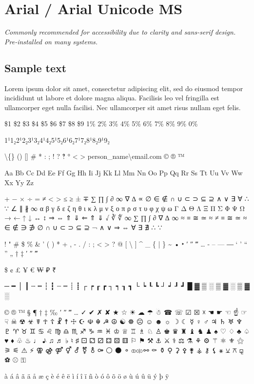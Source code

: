 \section{Arial / Arial Unicode MS}
\emph{Commonly recommended for accessibility due to clarity and sans-serif design. Pre-installed on many systems.}
\begin{raggedright}
\section*{Sample text}
Lorem ipsum dolor sit amet, consectetur adipiscing elit, sed do eiusmod tempor incididunt ut labore et dolore magna aliqua. Facilisis leo vel fringilla est ullamcorper eget nulla facilisi. Nec ullamcorper sit amet risus nullam eget felis.

\$1 \$2 \$3 \$4 \$5 \$6 \$7 \$8 \$9 1\% 2\% 3\% 4\% 5\% 6\% 7\% 8\% 9\% 0\%

1¹1₂2¹2₂3¹3₂4¹4₂5¹5₂6¹6₂7¹7₂8¹8₂9¹9₂

\textbackslash\{\} () [] \# * : ; ! ? ‽ ° \textless{} \textgreater{} person\_name\textbackslash{}email.com © ® ™

Aa Bb Cc Dd Ee Ff Gg Hh Ii Jj Kk Ll Mm Nn Oo Pp Qq Rr Ss Tt Uu Vv Ww Xx Yy Zz

+ − × ÷ = ≠ < > ≤ ≥ ± ∓
∑ ∏ ∫ ∂ ∞ ∇ ∆ ∝ ∅ ∈ ∉ ∩ ∪ ⊂ ⊃ ⊆ ⊇ ∧ ∨ ∃ ∀ ∴ ∵ ∠ ∥ ∦ ∞
α β γ δ ε ζ η θ ι κ λ μ ν ξ ο π ρ σ τ υ φ χ ψ ω
Γ Δ Θ Λ Ξ Π Σ Φ Ψ Ω
→ ← ↑ ↓ ↔ ↕ ⇒ ⇔ ⇑ ⇓ ⇐ ⇑ ⇓
√ ∛ ∜ ∞ ∑ ∏ ∫ ∂ ∇ ∆ ∞ ≈ ≡ ≅ ≃ ≈ ≠ ≡ ≅ ≃ ≈
∈ ∉ ∋ ∌ ∅ ∩ ∪ ⊂ ⊃ ⊆ ⊇
¬ ∧ ∨ ⇒ ⇔ ∀ ∃ ∄ ∴ ∵

! " \# \$ \% \& ' ( ) * + , - . / : ; \textless{} \textgreater{} ? @ [ \textbackslash{} ] \^{} \_ \{ | \} \~{}
• ‣ ′ ″ ‴ … ‐ – — ― ‘ ’ “ ” „ † ‡ ′ ″ ‴

\$ ¢ £ ¥ € ₩ ₽ ₹

─ ━ │ ┃ ┄ ┅ ┆ ┇ ┈ ┉ ┊ ┋ ┌ ┍ ┎ ┏ ┐ ┑ ┒ ┓ └ ┕ ┖ ┗ ┘ ┙ ┚ ┛
█ ▓ ▒ ░ ▒ ▓ ░ ▒ ▓ ░

© ® ™ § ¶ † ‡ ‰ ′ ″ ‴ … ✓ ✔ ✗ ✘ ★ ☆ ☀ ☁ ☂ ☃ ☎ ☏ ☑ ☒ ☓ ☚ ☛ ☜ ☝ ☞ ☟ ☠ ☢ ☣ ☤ ☥ ☦ ☧ ☨ ☩ ☪ ☫ ☬ ☭ ☮ ☯ ☸ ☹ ☺ ☻ ☼ ☽ ☾ ☿ ♀ ♂ ♃ ♄ ♅ ♆ ♇ ♈ ♉ ♊ ♋ ♌ ♍ ♎ ♏ ♐ ♑ ♒ ♓ ♔ ♕ ♖ ♗ ♘ ♙ ♚ ♛ ♜ ♝ ♞ ♟ ♠ ♡ ♢ ♣ ♤ ♥ ♦ ♧ ♨ ♩ ♪ ♫ ♬ ♭ ♮ ♯ ⚀ ⚁ ⚂ ⚃ ⚄ ⚅ ⚐ ⚑ ⚒ ⚓ ⚔ ⚕ ⚖ ⚗ ⚘ ⚙ ⚚ ⚛ ⚜ ⚝ ⚞ ⚟ ⚠ ⚡ ⚢ ⚣ ⚤ ⚥ ⚦ ⚧ ⚨ ⚩ ⚪ ⚫ ⚬ ⚭ ⚮ ⚯ ⚰ ⚱ ⚲ ⚳ ⚴ ⚵ ⚶ ⚷ ⚸ ⚹ ⚺ ⚻ ⚼ ⚽ ⚾ ⚿

à á â ã ä å æ ç è é ê ë ì í î ï ñ ò ó ô õ ö ø ù ú û ü ý þ ÿ
\end{raggedright}

